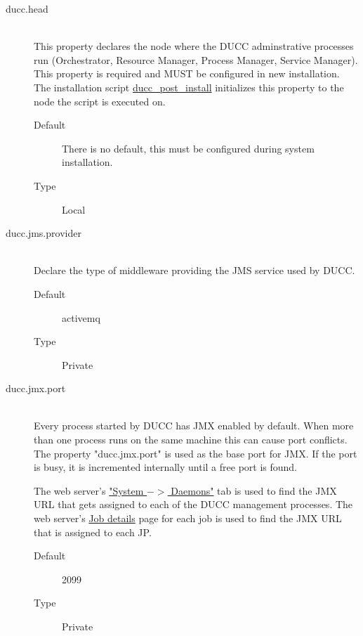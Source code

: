 \begin{description}
       \item[ducc.head] \hfill \\
         This property declares the node where the DUCC adminstrative processes run (Orchestrator,
         Resource Manager, Process Manager, Service Manager).  This property is required and MUST be
         configured in new installation.  The installation script
         \hyperref[subsec:install.single-user]{ducc\_post\_install} initializes this property to the
         node the script is executed on.
         \begin{description}
           \item[Default] There is no default, this must be configured during system installation.
           \item[Type] Local 
         \end{description}

       \item[ducc.jms.provider] \hfill \\
         Declare the type of middleware providing the JMS service used by DUCC.
         \begin{description}
           \item[Default] activemq 
           \item[Type]Private 
         \end{description}

       \item[ducc.jmx.port] \hfill \\
         Every process started by DUCC has JMX enabled by default. When more than one process 
         runs on the same machine this can cause port conflicts. The property "ducc.jmx.port" is 
         used as the base port for JMX. If the port is busy, it is incremented internally until a free 
         port is found. 
         
         The web server's \hyperref[sec:system-details.daemons]{"System $->$ Daemons"} tab is used
         to find the JMX URL that gets assigned to each of the DUCC management processes. The web
         server's \hyperref[sec:ws-job-details]{Job details} page for each job is used to find the
         JMX URL that is assigned to each JP.
         
         \begin{description}
           \item[Default] 2099 
           \item[Type] Private 
         \end{description}


\end{description}
